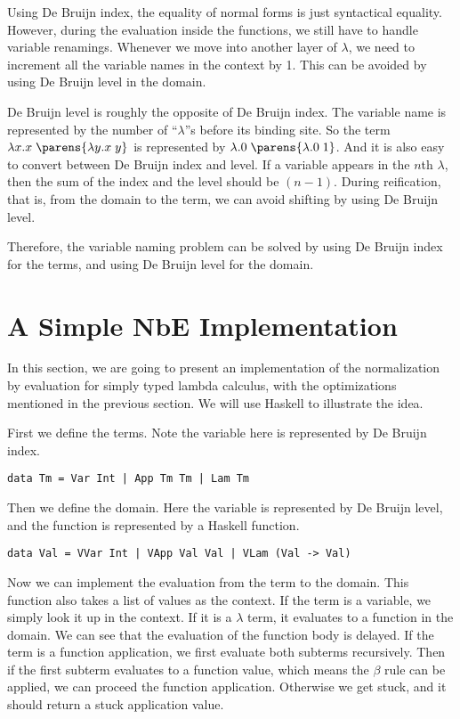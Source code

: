 \documentclass[11pt]{article}
\begin{document}
Using De Bruijn index, the equality of normal forms is just syntactical equality. However, during the evaluation inside the functions, we still have to handle variable renamings. Whenever we move into another layer of $\lambda$, we need to increment all the variable names in the context by 1. This can be avoided by using De Bruijn level in the domain.

De Bruijn level is roughly the opposite of De Bruijn index. The variable name is represented by the number of ``$\lambda$''s before its binding site. So the term $\lam{x}{\app{x}{\parens{\lam{y}{\app{x}{y}}}}}$ is represented by $\lam{}{\app{0}{\parens{\lam{}{\app{0}{1}}}}}$. And it is also easy to convert between De Bruijn index and level. If a variable appears in the $n$th $\lambda$, then the sum of the index and the level should be $(n-1)$. During reification, that is, from the domain to the term, we can avoid shifting by using De Bruijn level.

Therefore, the variable naming problem can be solved by using De Bruijn index for the terms, and using De Bruijn level for the domain.

\section{A Simple NbE Implementation}
In this section, we are going to present an implementation of the normalization by evaluation for simply typed lambda calculus, with the optimizations mentioned in the previous section. We will use Haskell to illustrate the idea.

First we define the terms. Note the variable here is represented by De Bruijn index.

\begin{verbatim}
data Tm = Var Int | App Tm Tm | Lam Tm
\end{verbatim}

Then we define the domain. Here the variable is represented by De Bruijn level, and the function is represented by a Haskell function.

\begin{verbatim}
data Val = VVar Int | VApp Val Val | VLam (Val -> Val)
\end{verbatim}

Now we can implement the evaluation from the term to the domain. This function also takes a list of values as the context. If the term is a variable, we simply look it up in the context. If it is a $\lambda$ term, it evaluates to a function in the domain. We can see that the evaluation of the function body is delayed. If the term is a function application, we first evaluate both subterms recursively. Then if the first subterm evaluates to a function value, which means the $\beta$ rule can be applied, we can proceed the function application. Otherwise we get stuck, and it should return a stuck application value.
\end{document}
